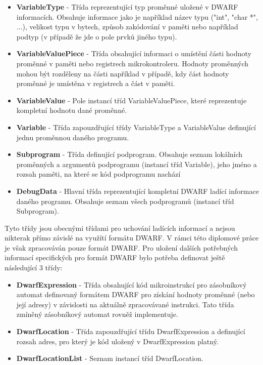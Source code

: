\begin{itemize}
\item \textbf{VariableType} - Třída reprezentující typ proměnné uložené v DWARF informacích. Obsahuje informace jako je například název typu ("int", "char *", ...), velikost typu v bytech, způsob zakódování v paměti nebo například podtyp (v případě že jde o pole prvků jiného typu).
\item \textbf{VariableValuePiece} - Třída obsahující informaci o umístění části hodnoty proměnné v paměti nebo registrech mikrokontroleru. Hodnoty proměnných mohou být rozděleny na části například v případě, kdy část hodnoty proměnné je umístěna v registrech a část v paměti.
\item \textbf{VariableValue} - Pole instancí tříd VariableValuePiece, které reprezentuje kompletní hodnotu dané proměnné.
\item \textbf{Variable} - Třída zapouzdřující třídy VariableType a VariableValue definující jednu proměnnou daného programu.
\item \textbf{Subprogram} - Třída definující podprogram. Obsahuje seznam lokálních proměnných a argumentů podprogramu (instancí tříd Variable), jeho jméno a rozsah paměti, na které se kód podprogramu nachází
\item \textbf{DebugData} - Hlavní třída reprezentující kompletní DWARF ladící informace daného programu. Obsahuje seznam všech podprogramů (instancí tříd Subprogram).
\end{itemize}

Tyto třídy jsou obecnými třídami pro uchování ladících informací a nejsou nikterak přímo závislé na využítí formátu DWARF. V rámci této diplomové práce je však zpracováván pouze formát DWARF. Pro uložení dalších potřebných informací specifických pro formát DWARF bylo potřeba definovat ještě následující 3 třídy:

\begin{itemize}
\item \textbf{DwarfExpression} - Třída obsahující kód mikroinstrukcí pro zásobníkový automat definovaný formátem DWARF pro získání hodnoty proměnné (nebo její adresy) v závislosti na aktuálně zpracovávané instrukci. Tato třída zmíněný zásobníkový automat rovněž implementuje.
\item \textbf{DwarfLocation} - Třída zapouzdřující třídu DwarfExpression a definující rozsah adres, pro který je kód uložený v DwarfExpression platný.
\item \textbf{DwarfLocationList} - Seznam instancí tříd DwarfLocation.
\end{itemize}

